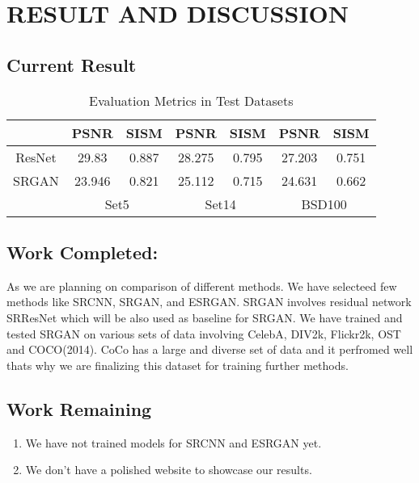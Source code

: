 \newpage
\section{RESULT AND DISCUSSION}
\subsection{Current Result}
\begin{table}[h]
    \centering
    \begin{tabular}{|c|c|c|c|c|c|c|}
    \hline
    &PSNR & SISM & PSNR & SISM & PSNR & SISM \\
    \hline
    ResNet&29.83 & 0.887 & 28.275 & 0.795 & 27.203 & 0.751 \\
    \hline
    SRGAN &23.946 & 0.821 &25.112 & 0.715 & 24.631 & 0.662 \\
    \hline
    & \multicolumn{2}{|c|}{Set5}& \multicolumn{2}{|c|}{Set14} & \multicolumn{2}{|c|}{BSD100} \\
    \hline
    \end{tabular}
    \caption{Evaluation Metrics in Test Datasets}
\end{table}

\subsection{Work Completed:}
As we are planning on comparison of different methods. We have selecteed few methods like SRCNN, SRGAN, and ESRGAN. SRGAN involves residual network SRResNet which will be also used as baseline for SRGAN. We have trained and tested SRGAN on various sets of data involving CelebA, DIV2k, Flickr2k, OST and COCO(2014). CoCo has a large and diverse set of data and it perfromed well thats why we are finalizing this dataset for training further methods. 
\subsection{Work Remaining}
\begin{enumerate}
    \item We have not trained models for SRCNN and ESRGAN yet.
    \item We don't have a polished website to showcase our results.
\end{enumerate}  
